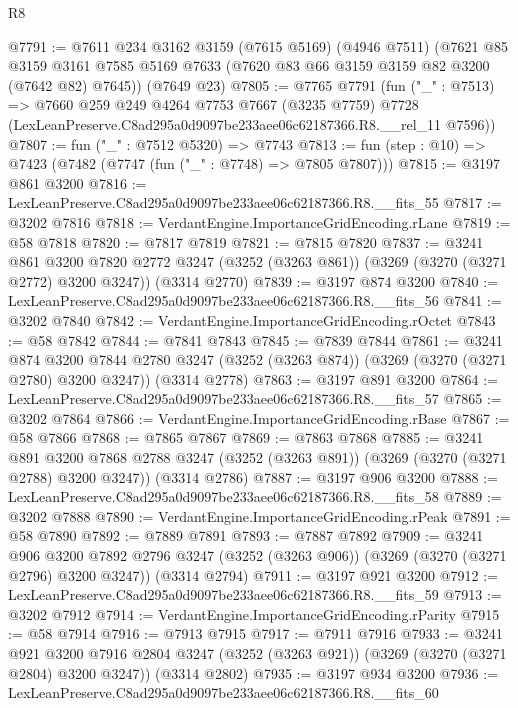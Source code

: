 \begin{lexlean}{R8}
\begin{coremodule}
@7791 := @7611
    @234
    @3162
    @3159
    (@7615 @5169)
    (@4946 @7511)
    (@7621
      @85
      @3159
      @3161
      @7585
      @5169
      @7633
      (@7620 @83 @66 @3159 @3159 @82 @3200 (@7642 @82) @7645))
    (@7649 @23)
@7805 := @7765
    @7791
    (fun ("_" : @7513) =>
    @7660
      @259
      @249
      @4264
      @7753
      @7667
      (@3235 @7759)
      @7728
      (LexLeanPreserve.C8ad295a0d9097be233aee06c62187366.R8.__rel_11 @7596))
@7807 := fun ("_" : @7512 @5320) => @7743
@7813 := fun (step : @10) => @7423 (@7482 (@7747 (fun ("_" : @7748) => @7805 @7807)))
@7815 := @3197 @861 @3200
@7816 := LexLeanPreserve.C8ad295a0d9097be233aee06c62187366.R8.__fits_55
@7817 := @3202 @7816
@7818 := VerdantEngine.ImportanceGridEncoding.rLane
@7819 := @58 @7818
@7820 := @7817 @7819
@7821 := @7815 @7820
@7837 := @3241
    @861
    @3200
    @7820
    @2772
    @3247
    (@3252 (@3263 @861))
    (@3269 (@3270 (@3271 @2772) @3200 @3247))
    (@3314 @2770)
@7839 := @3197 @874 @3200
@7840 := LexLeanPreserve.C8ad295a0d9097be233aee06c62187366.R8.__fits_56
@7841 := @3202 @7840
@7842 := VerdantEngine.ImportanceGridEncoding.rOctet
@7843 := @58 @7842
@7844 := @7841 @7843
@7845 := @7839 @7844
@7861 := @3241
    @874
    @3200
    @7844
    @2780
    @3247
    (@3252 (@3263 @874))
    (@3269 (@3270 (@3271 @2780) @3200 @3247))
    (@3314 @2778)
@7863 := @3197 @891 @3200
@7864 := LexLeanPreserve.C8ad295a0d9097be233aee06c62187366.R8.__fits_57
@7865 := @3202 @7864
@7866 := VerdantEngine.ImportanceGridEncoding.rBase
@7867 := @58 @7866
@7868 := @7865 @7867
@7869 := @7863 @7868
@7885 := @3241
    @891
    @3200
    @7868
    @2788
    @3247
    (@3252 (@3263 @891))
    (@3269 (@3270 (@3271 @2788) @3200 @3247))
    (@3314 @2786)
@7887 := @3197 @906 @3200
@7888 := LexLeanPreserve.C8ad295a0d9097be233aee06c62187366.R8.__fits_58
@7889 := @3202 @7888
@7890 := VerdantEngine.ImportanceGridEncoding.rPeak
@7891 := @58 @7890
@7892 := @7889 @7891
@7893 := @7887 @7892
@7909 := @3241
    @906
    @3200
    @7892
    @2796
    @3247
    (@3252 (@3263 @906))
    (@3269 (@3270 (@3271 @2796) @3200 @3247))
    (@3314 @2794)
@7911 := @3197 @921 @3200
@7912 := LexLeanPreserve.C8ad295a0d9097be233aee06c62187366.R8.__fits_59
@7913 := @3202 @7912
@7914 := VerdantEngine.ImportanceGridEncoding.rParity
@7915 := @58 @7914
@7916 := @7913 @7915
@7917 := @7911 @7916
@7933 := @3241
    @921
    @3200
    @7916
    @2804
    @3247
    (@3252 (@3263 @921))
    (@3269 (@3270 (@3271 @2804) @3200 @3247))
    (@3314 @2802)
@7935 := @3197 @934 @3200
@7936 := LexLeanPreserve.C8ad295a0d9097be233aee06c62187366.R8.__fits_60

\end{coremodule}
\end{lexlean}
